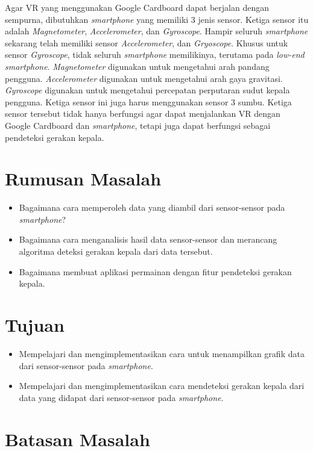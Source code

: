 Agar VR yang menggunakan Google Cardboard dapat berjalan dengan sempurna, dibutuhkan \textit{smartphone} yang memiliki 3 jenis sensor. Ketiga sensor itu adalah \textit{Magnetometer}, \textit{Accelerometer}, dan \textit{Gyroscope}.\cite{android_open_source_project} Hampir seluruh \textit{smartphone} sekarang telah memiliki sensor \textit{Accelerometer}, dan \textit{Gryoscope}. Khusus untuk sensor \textit{Gyroscope}, tidak seluruh \textit{smartphone} memilikinya, terutama pada \textit{low-end smartphone}. \textit{Magnetometer} digunakan untuk mengetahui arah pandang pengguna. \textit{Accelerometer} digunakan untuk mengetahui arah gaya gravitasi.\cite{bleser2009advanced} \textit{Gyroscope} digunakan untuk mengetahui percepatan perputaran sudut kepala pengguna. Ketiga sensor ini juga harus menggunakan sensor 3 sumbu. Ketiga sensor tersebut tidak hanya berfungsi agar dapat menjalankan VR dengan Google Cardboard dan \textit{smartphone}, tetapi juga dapat berfungsi sebagai pendeteksi gerakan kepala.
\section{Rumusan Masalah}

\begin{itemize}
	\item Bagaimana cara memperoleh data yang diambil dari sensor-sensor pada \textit{smartphone}?
	\item Bagaimana cara menganalisis hasil data sensor-sensor dan merancang algoritma deteksi gerakan kepala dari data tersebut.
	\item Bagaimana membuat aplikasi permainan dengan fitur pendeteksi gerakan kepala.
\end{itemize}

\section{Tujuan}

\begin{itemize}
	\item Mempelajari dan mengimplementasikan cara untuk menampilkan grafik data dari sensor-sensor pada \textit{smartphone}.
	\item Mempelajari dan mengimplementasikan cara mendeteksi gerakan kepala dari data yang didapat dari sensor-sensor pada \textit{smartphone}.
\end{itemize}

\section{Batasan Masalah}


